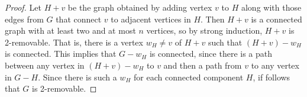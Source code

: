 \begin{problem}
\begin{solution}
\begin{proof}
Let $H + v$ be the graph obtained by adding vertex $v$ to $H$ along
with those edges from $G$ that connect $v$ to adjacent vertices in
$H$.  Then $H + v$ is a connected graph with at least two and at most
$n$ vertices, so by strong induction, $H+v$ is 2-removable.  That is,
there is a vertex $w_H \neq v$ of $H+v$ such that $(H+v)-w_H$ is
connected.  This implies that $G-w_H$ is connected, since there is a
path between any vertex in $(H+v)-w_H$ to $v$ and then a path from $v$
to any vertex in $G-H$.  Since there is such a $w_H$ for each
connected component $H$, if follows that $G$ is 2-removable.
\end{proof}
\end{solution}


\end{problem}
